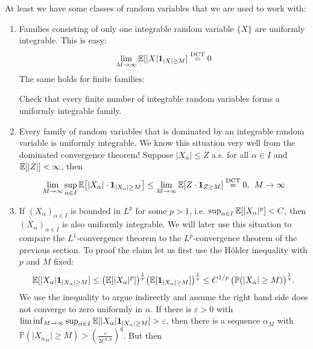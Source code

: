 \begin{example}\label{exui}
	At least we have some classes of random variables that we are used to work with:
	\begin{enumerate}[label=(\roman*)]
		\item Families consisting of only one integrable random variable $\{X\}$ are uniformly integrable. This is easy:
			\begin{align*}
				 \lim_{M \to \infty} \mathbb{E}[\lvert X \rvert \mathbf 1_{\lvert X \rvert \geq M}] \overset{\text{DCT}}{=} 0
			 \end{align*}
			 The same holds for finite families:
			 \begin{luebung}
				Check that every finite number of integrable random variables forms a uniformly integrable family.
			\end{luebung}
		\item Every family of random variables that is dominated by an integrable random variable is uniformly integrable. We know this situation very well from the dominated convergence theorem! Suppose $\lvert X_{\alpha} \rvert \leq Z$ a.s. for all $\alpha\in I$ and $\mathbb{E}[\lvert Z \rvert] < \infty$, then
			\begin{align*}
				\lim_{M\to\infty}\sup\limits_{\alpha \in I}\mathbb{E}\big[\lvert X_{\alpha}\rvert \cdot \mathbf 1_{\lvert X_{\alpha}\rvert \geq M}\big] \leq \lim_{M\to\infty}\mathbb{E}[Z \cdot \mathbf 1_{Z\geq M}] \overset{\text{DCT}}{=} 0,\:\: M \to \infty
			\end{align*}
		\item
			If $(X_{\alpha})_{\alpha\in I}$ is bounded in $L^p$ for some $p>1$, i.e. $\sup_{\alpha\in I} \mathbb{E}[\lvert X_{\alpha}\rvert^p] < C$, then $(X_{\alpha})_{\alpha \in I}$ is also uniformly integrable. We will later use this situation to compare the $L^1$-convergence theorem to the $L^p$-convergence theorem of the previous section. To proof the claim let us first use the H\"older inequality with $p$ and $M$ fixed:
			\begin{align}\label{furchtbar}
				\mathbb{E}[\lvert X_{\alpha}\rvert \mathbf 1_{\lvert X_{\alpha}\rvert \geq M}] \leq \big( \mathbb{E}[\lvert X_{\alpha}\rvert^p]\big)^{\frac{1}{p}} \big(\mathbb{E}[\mathbf 1_{\lvert X_{\alpha}\rvert \geq M}]\big)^{\frac{1}{q}}\leq C^{1/p}\, \big(\mathbb P({\lvert X_{\alpha}\rvert \geq M})\big)^{\frac{1}{q}}.
			\end{align}
			We use the inequality to argue indirectly and assume the right hand side does not converge to zero uniformly in $\alpha$. If there is $\varepsilon > 0$ with $\liminf_{M\to \infty}\sup_{\alpha\in I}\mathbb{E}[\lvert X_{\alpha}\rvert \mathbf 1_{\lvert X_{\alpha}\rvert \geq M}] > \varepsilon$, then there is a sequence $\alpha_M$ with $\mathbb{P}(\lvert X_{\alpha_M}\rvert \geq M) > (\frac{\varepsilon}{2 C^{1/p}})^q$. But then

\end{enumerate}
\end{example}
